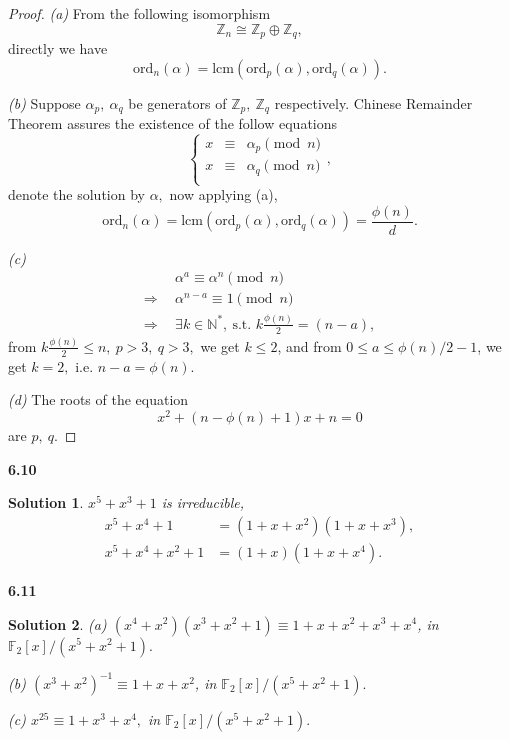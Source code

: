 \documentclass[12pt,a4paper]{article}
\newcommand{\lra}{\Longrightarrow}
\theoremstyle{solution}
\newtheorem*{sol}{Solution}
\begin{document}
\begin{proof}
{\em (a)} From the following isomorphism
$$\mathbb{Z}_n \cong \mathbb{Z}_p \oplus \mathbb{Z}_q,$$
directly we have
$$\mathrm{ord}_n(\alpha)=\mathrm{lcm}(\mathrm{ord}_p(\alpha),\mathrm{ord}_q(\alpha)).$$

{\em (b)} Suppose $\alpha_p,~\alpha_q$ be generators of $\mathbb{Z}_p,~\mathbb{Z}_q$ respectively. Chinese Remainder Theorem assures the existence of the follow equations
$$
\left\{
\begin{array}{lll}
x&\equiv&\alpha_p \pmod{n}\\
x&\equiv&\alpha_q \pmod{n}\\
\end{array}
\right. ,
$$
denote the solution by $\alpha,$ now applying (a),
$$\mathrm{ord}_n(\alpha)=\mathrm{lcm}(\mathrm{ord}_p(\alpha),\mathrm{ord}_q(\alpha))=\frac{\phi(n)}{d}.$$

{\em (c)}
\begin{align*}
 &~\alpha^a \equiv \alpha^n \pmod{n}\\
\lra~&~\alpha^{n-a}\equiv 1 \pmod{n}\\
\lra~&~\exists k\in \mathbb{N}^*,~\text{s.t. } k\frac{\phi(n)}{2}=(n-a),
\end{align*}
from $k\frac{\phi(n)}{2}\leq n,~p>3,~q>3,$ we get $k \leq 2$, and from $0\leq a\leq \phi(n)/2-1$, we get $k=2,$ i.e. $n-a=\phi(n).$

{\em (d)} The roots of the equation
$$x^2+(n-\phi(n)+1)x+n=0$$
are $p,~q$.
\end{proof}

\textbf{6.10}

\begin{sol}$x^5+x^3+1$ is irreducible,
\begin{align*}
x^5+x^4+1&=\left(1+x+x^2\right) \left(1+x+x^3\right),\\
x^5+x^4+x^2+1&=(1+x) \left(1+x+x^4\right).
\end{align*}
\end{sol}

\textbf{6.11}

\begin{sol}
{\em (a)} $(x^4+x^2)(x^3+x^2+1)\equiv 1+x+x^2+x^3+x^4$, in $\mathbb{F}_2[x]/(x^5+x^2+1).$

{\em (b)} $(x^3+x^2)^{-1}\equiv 1+x+x^2$, in $\mathbb{F}_2[x]/(x^5+x^2+1).$

{\em (c)} $x^{25}\equiv 1+x^3+x^4,$ in $\mathbb{F}_2[x]/(x^5+x^2+1).$
\end{sol}
\end{document}
